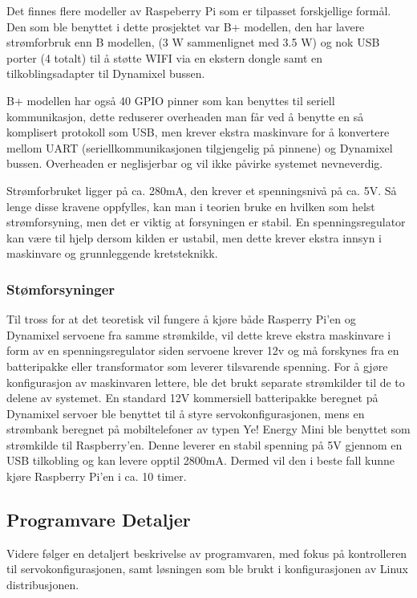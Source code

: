 \documentclass[12pt]{report}
\begin{document}
Det finnes flere modeller av Raspeberry Pi som er tilpasset forskjellige formål. Den som ble benyttet i dette prosjektet var B+ modellen, den har lavere strømforbruk enn B modellen, (3 W sammenlignet med 3.5 W) og nok USB porter (4 totalt) til å støtte WIFI via en ekstern dongle samt en tilkoblingsadapter til Dynamixel bussen. 

B+ modellen har også 40 GPIO pinner som kan benyttes til seriell kommunikasjon, dette reduserer overheaden man får ved å benytte en så komplisert protokoll som USB, men krever ekstra maskinvare for å konvertere mellom UART (seriellkommunikasjonen tilgjengelig på pinnene) og Dynamixel bussen. Overheaden er neglisjerbar og vil ikke påvirke systemet nevneverdig.

Strømforbruket ligger på ca. 280mA, den krever et spenningsnivå på ca. 5V. Så lenge disse kravene oppfylles, kan man i teorien bruke en hvilken som helst strømforsyning, men det er viktig at forsyningen er stabil. En spenningsregulator kan være til hjelp dersom kilden er ustabil, men dette krever ekstra innsyn i maskinvare og grunnleggende kretsteknikk.

\subsubsection{Stømforsyninger}
Til tross for at det teoretisk vil fungere å kjøre både Rasperry Pi’en og Dynamixel servoene fra samme strømkilde, vil dette kreve ekstra maskinvare i form av en spenningsregulator siden servoene krever 12v og må forskynes fra en batteripakke eller transformator som leverer tilsvarende spenning. For å gjøre konfigurasjon av maskinvaren lettere, ble det brukt separate strømkilder til de to delene av systemet. En standard 12V kommersiell batteripakke beregnet på Dynamixel servoer ble benyttet til å styre servokonfigurasjonen, mens en strømbank beregnet på mobiltelefoner av typen Ye! Energy Mini\cite{Energybank} ble benyttet som strømkilde til Raspberry’en. Denne leverer en stabil spenning på 5V gjennom en USB tilkobling og kan levere opptil 2800mA. Dermed vil den i beste fall kunne kjøre Raspberry Pi’en i ca. 10 timer.

\subsection{Programvare Detaljer}
Videre følger en detaljert beskrivelse av programvaren, med fokus på kontrolleren til servokonfigurasjonen, samt løsningen som ble brukt i konfigurasjonen av Linux distribusjonen.
\end{document}
